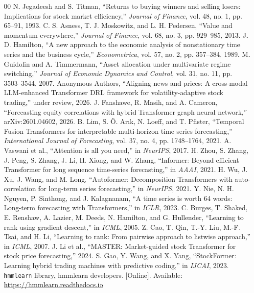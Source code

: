 \documentclass[conference]{IEEEtran}
\begin{document}
\begin{thebibliography}{00}
 N. Jegadeesh and S. Titman, ``Returns to buying winners and selling losers: Implications for stock market efficiency,'' \textit{Journal of Finance}, vol. 48, no. 1, pp. 65--91, 1993.
 C. S. Asness, T. J. Moskowitz, and L. H. Pedersen, ``Value and momentum everywhere,'' \textit{Journal of Finance}, vol. 68, no. 3, pp. 929--985, 2013.
 J. D. Hamilton, ``A new approach to the economic analysis of nonstationary time series and the business cycle,'' \textit{Econometrica}, vol. 57, no. 2, pp. 357--384, 1989.
 M. Guidolin and A. Timmermann, ``Asset allocation under multivariate regime switching,'' \textit{Journal of Economic Dynamics and Control}, vol. 31, no. 11, pp. 3503--3544, 2007.
 Anonymous Authors, ``Aligning news and prices: A cross-modal LLM-enhanced Transformer DRL framework for volatility-adaptive stock trading,'' under review, 2026.
 J. Fanshawe, R. Masih, and A. Cameron, ``Forecasting equity correlations with hybrid Transformer graph neural network,'' arXiv:2601.04602, 2026.
 B. Lim, S. \"O. Ar\i k, N. Loeff, and T. Pfister, ``Temporal Fusion Transformers for interpretable multi-horizon time series forecasting,'' \textit{International Journal of Forecasting}, vol. 37, no. 4, pp. 1748--1764, 2021.
 A. Vaswani et al., ``Attention is all you need,'' in \textit{NeurIPS}, 2017.
 H. Zhou, S. Zhang, J. Peng, S. Zhang, J. Li, H. Xiong, and W. Zhang, ``Informer: Beyond efficient Transformer for long sequence time-series forecasting,'' in \textit{AAAI}, 2021.
 H. Wu, J. Xu, J. Wang, and M. Long, ``Autoformer: Decomposition Transformers with auto-correlation for long-term series forecasting,'' in \textit{NeurIPS}, 2021.
 Y. Nie, N. H. Nguyen, P. Sinthong, and J. Kalagnanam, ``A time series is worth 64 words: Long-term forecasting with Transformers,'' in \textit{ICLR}, 2023.
 C. Burges, T. Shaked, E. Renshaw, A. Lazier, M. Deeds, N. Hamilton, and G. Hullender, ``Learning to rank using gradient descent,'' in \textit{ICML}, 2005.
 Z. Cao, T. Qin, T.-Y. Liu, M.-F. Tsai, and H. Li, ``Learning to rank: From pairwise approach to listwise approach,'' in \textit{ICML}, 2007.
 J. Li et al., ``MASTER: Market-guided stock Transformer for stock price forecasting,'' 2024.
 S. Gao, Y. Wang, and X. Yang, ``StockFormer: Learning hybrid trading machines with predictive coding,'' in \textit{IJCAI}, 2023.
 \texttt{hmmlearn} library, hmmlearn developers. [Online]. Available: \url{https://hmmlearn.readthedocs.io}
\end{thebibliography}
\end{document}
